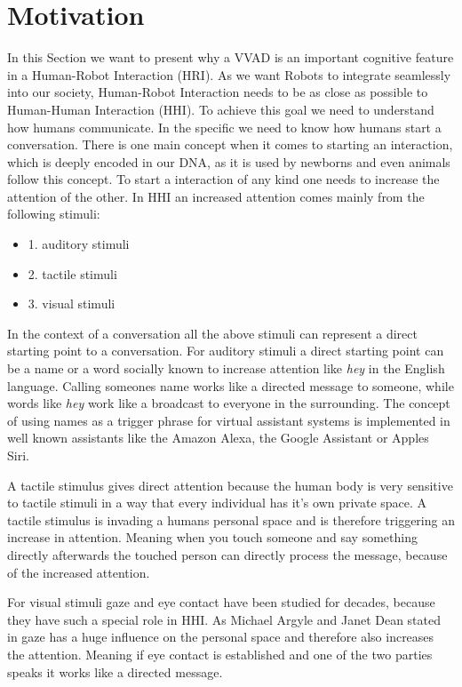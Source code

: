 \section{Motivation}\label{sec:motivation}
In this Section we want to present why a VVAD is an important cognitive feature in a Human-Robot Interaction (HRI).
As we want Robots to integrate seamlessly into our society, Human-Robot Interaction needs to be as close as possible to Human-Human Interaction (HHI). To achieve this goal we need to understand how humans communicate.
In the specific we need to know how humans start a conversation.
There is one main concept when it comes to starting an interaction, which is deeply encoded in our DNA, as it is used by newborns and even animals follow this concept. To start a interaction of any kind one needs to increase the attention of the other. In HHI an increased attention comes mainly from the following stimuli:
\begin{itemize}
  \item {1.} auditory stimuli
  \item {2.} tactile stimuli
  \item {3.} visual stimuli
\end{itemize}
In the context of a conversation all the above stimuli can represent a direct starting point to a conversation.
For auditory stimuli a direct starting point can be a name or a word socially known to increase attention
like \emph{hey} in the English language. Calling someones name works like a directed message to someone, while words like \emph{hey} work like a broadcast to everyone in the surrounding. The concept of using names as a trigger phrase for virtual assistant systems is implemented in well known assistants like the Amazon Alexa, the Google Assistant or Apples Siri.

A tactile stimulus gives direct attention because the human body is very sensitive to tactile stimuli in a way that every individual has it's own private space. A tactile stimulus is invading a humans personal space and is therefore triggering an increase in attention. Meaning when you touch someone and say something directly afterwards the touched person can directly process the message, because of the increased attention.

For visual stimuli gaze and eye contact have been studied for decades, because they have such a special role in HHI. As Michael Argyle and Janet Dean stated in \cite{ARGYLE1965} gaze has a huge influence on the personal space and therefore also increases the attention. Meaning if eye contact is established and one of the two parties speaks it works like a directed message.


